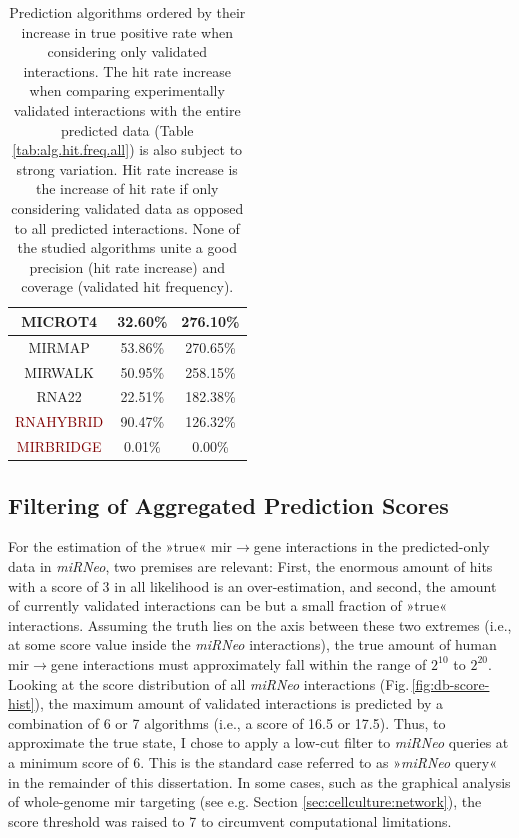 \begin{table}
{\begin{tabular}{c | c | c}
\textcolor{OliveGreen}{MICROT4} & 32.60\% & 276.10\%\\ \hline
\textcolor{OliveGreen}{MIRMAP} & 53.86\% & 270.65\%\\ \hline
\textcolor{OliveGreen}{MIRWALK} & 50.95\% & 258.15\%\\ \hline
\textcolor{OliveGreen}{RNA22} & 22.51\% & 182.38\%\\ \hline
\textcolor{Maroon}{RNAHYBRID} & 90.47\% & 126.32\%\\ \hline
\textcolor{Maroon}{MIRBRIDGE} & 0.01\% & 0.00\%\\ \hline
\end{tabular}
\caption{Prediction algorithms ordered by their increase in true positive rate when considering only validated interactions. The hit rate increase when comparing experimentally validated interactions with the entire predicted data (Table \ref{tab:alg.hit.freq.all}) is also subject to strong variation. Hit rate increase is the increase of hit rate if only considering validated data as opposed to all predicted interactions. None of the studied algorithms unite a good precision (hit rate increase) and coverage (validated hit frequency).}
\label{tab:alg.hit.freq.val}
}
\end{table}

\subsection{Filtering of Aggregated Prediction Scores}
For the estimation of the »true« \ac{mir}$\to$gene interactions in the predicted-only data in \textit{miRNeo}, two premises are relevant: First, the enormous amount of hits with a score of 3 in all likelihood is an over-estimation, and second, the amount of currently validated interactions can be but a small fraction of »true« interactions. Assuming the truth lies on the axis between these two extremes (i.e., at some score value inside the \textit{miRNeo} interactions), the true amount of human \ac{mir}$\to$gene interactions must approximately fall within the range of $2^{10}$ to $2^{20}$. Looking at the score distribution of all \textit{miRNeo} interactions (Fig.\,\ref{fig:db-score-hist}), the maximum amount of validated interactions is predicted by a combination of 6 or 7 algorithms (i.e., a score of 16.5 or 17.5). Thus, to approximate the true state, I chose to apply a low-cut filter to \textit{miRNeo} queries at a minimum score of 6. This is the standard case referred to as »\textit{miRNeo} query« in the remainder of this dissertation. In some cases, such as the graphical analysis of whole-genome \ac{mir} targeting (see e.g. Section \ref{sec:cellculture:network}), the score threshold was raised to 7 to circumvent computational limitations.

